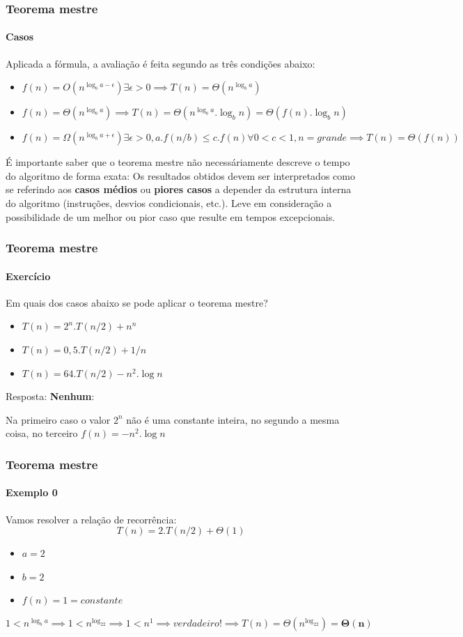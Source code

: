 \begin{frame}
	\frametitle{Teorema mestre}
	\framesubtitle{Casos}
	\par Aplicada a fórmula, a avaliação é feita segundo as três condições abaixo:
	\begin{itemize}
		\item $f(n) = O(n^{\log_ba-\epsilon}) \exists \epsilon > 0 \implies T(n) = \Theta(n^{\log_ba})$
		\item $f(n) = \Theta(n^{\log_ba}) \implies T(n) = \Theta(n^{\log_ba}.\log_bn) = \Theta(f(n).\log_bn)$
		\item $f(n) = \Omega(n^{\log_ba+\epsilon})\exists \epsilon>0, a.f(n/b) \leq c.f(n) \forall 0 < c < 1, n=grande \implies T(n) = \Theta(f(n))$
	\end{itemize}
	\par É importante saber que o teorema mestre não necessáriamente descreve o tempo do algoritmo de forma exata: Os resultados obtidos devem ser interpretados como se referindo aos \textbf{casos médios} ou \textbf{piores casos} a depender da estrutura interna do algoritmo (instruções, desvios condicionais, etc.). Leve em consideração a possibilidade de um melhor ou pior caso que resulte em tempos excepcionais. 
\end{frame}

\begin{frame}
	\frametitle{Teorema mestre}
	\framesubtitle{Exercício}
	\par Em quais dos casos abaixo se pode aplicar o teorema mestre?
	\begin{itemize}
		\item $T(n) = 2^n.T(n/2)+n^n$
		\item $T(n) = 0,5.T(n/2)+1/n$
		\item $T(n) = 64.T(n/2) -n^2.\log n$
	\end{itemize}
	\pause
	\par Resposta: \pause \textbf{Nenhum}:
	\par Na primeiro caso o valor $2^n$ não é uma constante inteira, no segundo a mesma coisa, no terceiro $f(n)=-n^2.\log n$
\end{frame}

\begin{frame}
	\frametitle{Teorema mestre}
	\framesubtitle{Exemplo 0}
	\par Vamos resolver a relação de recorrência:
	\begin{equation}
		T(n) = 2.T(n/2) + \Theta(1)
	\end{equation}

	\begin{itemize}
		\item $a = 2$ 
		\item $b = 2$ 
		\item $f(n) = 1 = constante$ 
	\end{itemize}

	\begin{equation}
		1 < n^{\log_ba} \implies 1 < n^{\log_22} \implies 1 < n^1 \implies verdadeiro! \implies T(n)=\Theta(n^{\log_22}) = \mathbf{\Theta(n)}
	\end{equation}
\end{frame}

